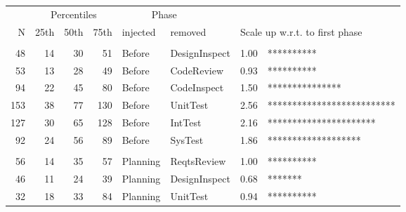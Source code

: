 \documentclass[smallcondesed]{svjour3}
\def\baselinestretch{1}
\begin{document}
\begin{figure}[!t] 
 \renewcommand{\baselinestretch}{0.7}
 \scriptsize
\begin{center}
\begin{tabular}{r@{~}|r@{~}r@{~}r|@{~}l@{~}l|@{~}r@{~}l}   
  \multicolumn{1}{c}{~} &\multicolumn{3}{c}{Percentiles}&\multicolumn{2}{l}{~~~~~~Phase}\\
N & 25th & 50th & 75th &   injected & removed   & \multicolumn{2}{l}{Scale up w.r.t. to first phase}\\\hline
\\
 48&   14&   30&   51&Before&DesignInspect &1.00 & **********  \\
 53&   13&   28&   49&Before&CodeReview &0.93 & **********  \\
 94&   22&   45&   80&Before&CodeInspect &1.50 & ***************  \\
153&   38&   77&  130&Before&UnitTest &2.56 & **************************  \\
127&   30&   65&  128&Before&IntTest &2.16 & **********************  \\
 92&   24&   56&   89&Before&SysTest &1.86 & *******************  \\
 
 
\\
 56&   14&   35&   57&Planning&ReqtsReview &1.00 & **********  \\
 46&   11&   24&   39&Planning&DesignInspect &0.68 & *******  \\
 32&   18&   33&   84&Planning&UnitTest &0.94 & **********  \\
 

\end{tabular}
\end{center}
\end{figure}
\end{document}
